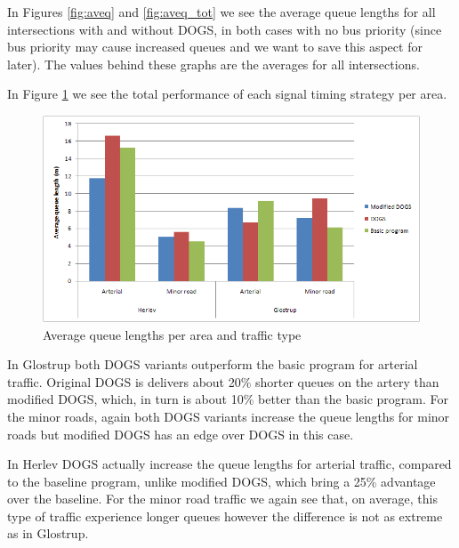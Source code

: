 In Figures \ref{fig:aveq} and \ref{fig:aveq_tot} we see the average queue lengths for all intersections with and without DOGS, in both cases with no bus priority (since bus priority may cause increased queues and we want to save this aspect for later). The values behind these graphs are the averages for all intersections.

In Figure \ref{fig:aveq_detail} we see the total performance of each signal timing strategy per area. 

\begin{figure}[ht]
\begin{center}
\includegraphics[scale=0.40]{aveq_total_area_vs_traffic-type.png} 
\end{center}
\caption{Average queue lengths per area and traffic type}
\label{fig:aveq_detail}
\end{figure}

In Glostrup both DOGS variants outperform the basic program for arterial traffic. Original DOGS is delivers about 20\% shorter queues on the artery than modified DOGS, which, in turn is about 10\% better than the basic program. For the minor roads, again both DOGS variants increase the queue lengths for minor roads but modified DOGS has an edge over DOGS in this case.

In Herlev DOGS actually increase the queue lengths for arterial traffic, compared to the baseline program, unlike modified DOGS, which bring a 25\% advantage over the baseline. For the minor road traffic we again see that, on average, this type of traffic experience longer queues however the difference is not as extreme as in Glostrup.

